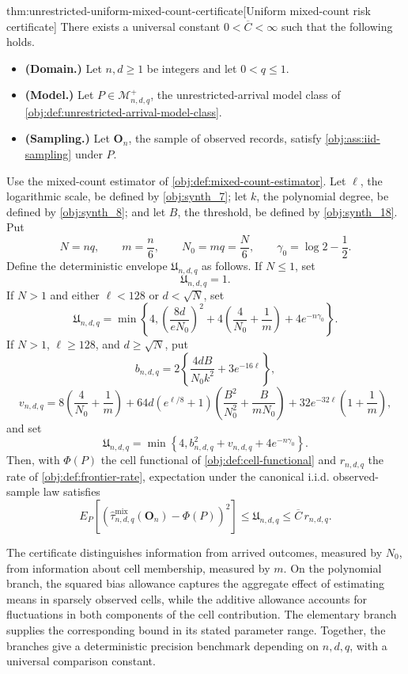 \documentclass[11pt]{article}
\begin{document}
\begin{theoremv}{thm:unrestricted-uniform-mixed-count-certificate}[Uniform mixed-count risk certificate]
There exists a universal constant \(0<\overline C<\infty\) such that the following holds.
\begin{itemize}
\item \textbf{(Domain.)} Let \(n,d\ge1\) be integers and let \(0<q\le1\).
\item \textbf{(Model.)} Let \(P\in\mathcal M^{+}_{n,d,q}\), the unrestricted-arrival model class of \cref{obj:def:unrestricted-arrival-model-class}.
\item \textbf{(Sampling.)} Let \(\mathbf O_n\), the sample of observed records, satisfy \cref{obj:ass:iid-sampling} under \(P\).
\end{itemize}
Use the mixed-count estimator of \cref{obj:def:mixed-count-estimator}. Let \(\ell\), the logarithmic scale, be defined by \cref{obj:synth_7}; let \(k\), the polynomial degree, be defined by \cref{obj:synth_8}; and let \(B\), the threshold, be defined by \cref{obj:synth_18}. Put
\[
N=nq,\qquad m=\frac n6,\qquad N_0=mq=\frac N6,
\qquad \gamma_0=\log 2-\frac12.
\]
Define the deterministic envelope \(\mathfrak U_{n,d,q}\) as follows. If \(N\le1\), set
\[
\mathfrak U_{n,d,q}=1.
\]
If \(N>1\) and either \(\ell<128\) or \(d<\sqrt N\), set
\[
\mathfrak U_{n,d,q}
=\min\left\{4,
\left(\frac{8d}{eN_0}\right)^2
+4\left(\frac4{N_0}+\frac1m\right)
+4e^{-n\gamma_0}\right\}.
\]
If \(N>1\), \(\ell\ge128\), and \(d\ge\sqrt N\), put
\[
b_{n,d,q}
=2\left\{\frac{4dB}{N_0k^2}+3e^{-16\ell}\right\},
\]
\[
v_{n,d,q}
=8\left(\frac4{N_0}+\frac1m\right)
+64d(e^{\ell/8}+1)
\left(\frac{B^2}{N_0^2}+\frac{B}{mN_0}\right)
+32e^{-32\ell}\left(1+\frac1m\right),
\]
and set
\[
\mathfrak U_{n,d,q}
=\min\left\{4,b_{n,d,q}^2+v_{n,d,q}
+4e^{-n\gamma_0}\right\}.
\]
Then, with \(\Phi(P)\) the cell functional of \cref{obj:def:cell-functional} and \(r_{n,d,q}\) the rate of \cref{obj:def:frontier-rate}, expectation under the canonical i.i.d. observed-sample law satisfies
\[
E_P\!\left[
\left(\widehat\tau^{\mathrm{mix}}_{n,d,q}(\mathbf O_n)-\Phi(P)\right)^2
\right]
\le \mathfrak U_{n,d,q}
\le \overline C\,r_{n,d,q}.
\]
\end{theoremv}

The certificate distinguishes information from arrived outcomes, measured by \(N_0\), from information about cell membership, measured by \(m\). On the polynomial branch, the squared bias allowance captures the aggregate effect of estimating means in sparsely observed cells, while the additive allowance accounts for fluctuations in both components of the cell contribution. The elementary branch supplies the corresponding bound in its stated parameter range. Together, the branches give a deterministic precision benchmark depending on \(n,d,q\), with a universal comparison constant.
\end{document}
